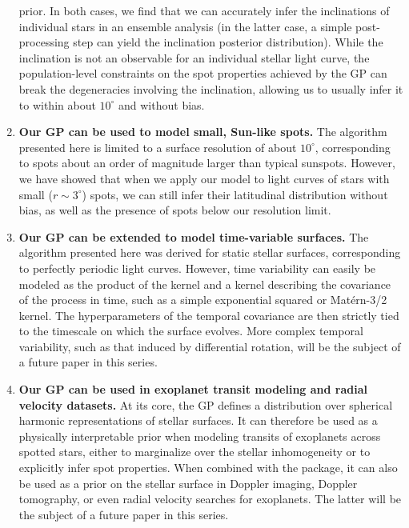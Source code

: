 \documentclass[modern,linenumbers]{aastex62}
\begin{document}
\begin{enumerate}
          prior. In both cases, we find that we can accurately infer the inclinations
          of individual stars in an ensemble analysis (in the latter case, a
          simple post-processing step can yield the inclination posterior distribution).
          While the inclination is not an observable for an individual stellar light
          curve, the population-level constraints on the spot properties achieved
          by the GP can break the degeneracies involving the inclination, allowing
          us to usually infer it to within about $10^\circ$ and without bias.
    \item \textbf{Our GP can be used to model small, Sun-like spots.} The algorithm
          presented here is limited to a surface resolution of about $10^\circ$,
          corresponding to spots about an order of magnitude larger than typical
          sunspots. However, we have showed that when we apply our model to
          light curves of stars with small ($r \sim 3^\circ$) spots, we can
          still infer their latitudinal distribution without bias, as well as
          the presence of spots below our resolution limit.
    \item \textbf{Our GP can be extended to model time-variable surfaces.} The
          algorithm presented here was derived for static stellar surfaces,
          corresponding to perfectly periodic light curves. However, time
          variability can easily be modeled as the product of the \starryprocess
          kernel and a kernel describing the covariance of the process in
          time, such as a simple exponential squared or Mat\'ern-3/2 kernel.
          The hyperparameters of the temporal covariance are then strictly
          tied to the timescale on which the surface evolves. More
          complex temporal variability, such as that induced by differential
          rotation, will be the subject of a future paper in this series.
    \item \textbf{Our GP can be used in exoplanet transit modeling and
              radial velocity datasets.} At its core, the \starryprocess GP
          defines a distribution over spherical harmonic representations
          of stellar surfaces. It can therefore be used as a physically
          interpretable prior when modeling transits of exoplanets across
          spotted stars, either to marginalize over the stellar inhomogeneity
          or to explicitly infer spot properties. When combined with the
          \starry package, it can also be used as a
          prior on the stellar surface in Doppler imaging, Doppler tomography,
          or even radial velocity searches for exoplanets. The latter will
          be the subject of a future paper in this series.
\end{enumerate}
\end{document}
